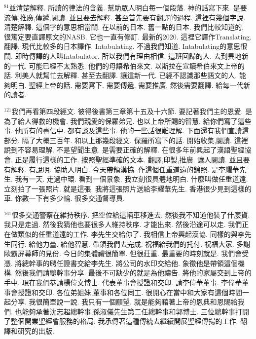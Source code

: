 \documentclass{book}
\begin{document}
$^{81}$並清楚解釋.
所讀的律法的含義.
幫助眾人明白每一個段落.
神的話寫下來.
是要流傳,推廣,傳遞,閱讀.
並且要去解釋.
甚至首先要有翻譯的過程.
這裡有幾個字說.
清楚解釋.
這個字的意思相當闊.
在以前的日本.
舊一點的日本.
我們比較知道的.
很篤定要直譯原文的NASB.
它也一直有修訂.
最新的2020.
這裡它譯作Translating.
翻譯.
現代比較多的日本譯作.
Intabulating.
不過我們知道.
Intabulating的意思很闊.
即時傳譯的人叫Intabulator.
所以我們有理由相信.
這班回歸的人.
去到異地新的一代.
可能已經不太熟悉.
他們的母語希伯來文.
以斯拉在宣讀希伯來文上帝的話.
利美人就幫忙去解釋.
甚至去翻譯.
讓這新一代.
已經不認識那些語文的人.
能夠明白.
聖經上帝的話.
需要寫下.
需要傳遞.
需要推廣.
然後需要翻譯.
給每一代新的讀者.

$^{121}$我們再看第四段經文.
彼得後書第三章第十五及十六節.
要記著我們主的恩愛.
是為了給人得救的機會.
我們親愛的保羅弟兄.
也以上帝所賜的智慧.
給你們寫了這些事.
他所有的書信中.
都有談及這些事.
他的一些話很難理解.
下面還有我們宣讀這部分.
隔了大概三百年.
和以上那幾段經文.
保羅所寫下的話.
開始收集,閱讀.
這裡說到不容易理解.
不是望聞生意.
是需要正確的解釋.
在很多年前興起了漢語聖經協會.
正是履行這樣的工作.
按照聖經準確的文本.
翻譯,印製,推廣.
讓人閱讀.
並且要有解釋.
有說明.
協助人明白.
今天帶領漢協.
作這個任重道遠的錦照.
是李耀華先生.
我有一天.
走過中環.
看到一個景象.
我立刻很具體地明白.
什麼叫做任重道遠.
立刻拍了一張照片.
就是這張.
我將這張照片送給李耀華先生.
香港很少見到這樣的車.
你數一下有多少輪.
很多交通督導員.

$^{161}$很多交通警察在維持秩序.
把空位給這輛車移進去.
然後我不知道他裝了什麼貨.
我只是走過.
然後我猜他也要很多人維持秩序.
才能出來.
然後沿途可以走.
我們正在做類似的任重道遠的工作.
李先生交給你了.
我相信上帝興起漢協.
同樣的與李先生同行.
給他力量.
給他智慧.
帶領我們去完成.
祝福給我們的托付.
祝福大家.
多謝歐霸屏幕師的見份.
今日的集體禮很簡單.
但很莊重.
最重要的時刻就是.
我們會受憑.
將總幹事的聘任證書交給李先生.
將公司的水印交給他.
象徵他是帶領這個機構.
然後我們請總幹事分享.
最後不可缺少的就是為他禱告.
將他的家屬交到上帝的手中.
現在我們恭請楊偉文博士.
代表董事會授證和交印.
請李偉華董事.
李偉華董事會授證和交印.
各位弟姐妹,董事和各位同工.
很開心在當中和大家有這個時間一起分享.
我很簡單說一說.
我只有一個願望.
就是能夠藉著上帝的恩典和恩賜給我們.
也能夠承著沈志超總幹事,孫淑儀先生第二任總幹事和郭博士.
三位總幹事打開了整個開業聖經會服務的格局.
我承傳著這種傳統去繼續開展聖經傳揚的工作.
翻譯和研究的出版.
\end{document}
